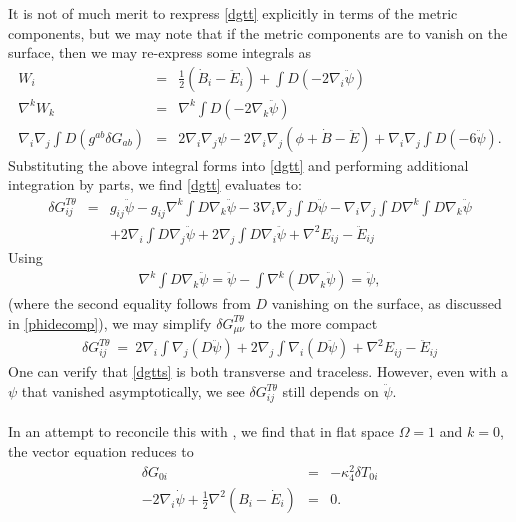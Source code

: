 \documentclass[10pt,letterpaper]{article}
\numberwithin{equation}{section}
\begin{document}
It is not of much merit to rexpress \eqref{dgtt} explicitly in terms of the metric components, but we may note that if the metric components are to vanish on the surface, then we may re-express some integrals as
\begin{eqnarray}
W_i &=& \tfrac12 (\dot B_i-\ddot E_i) + \int D (-2\nabla_i\ddot \psi)
\nonumber\\
\nabla^k W_k &=& \nabla^k \int D(-2\nabla_k \ddot\psi)
\nonumber\\
\nabla_i\nabla_j\int D(g^{ab}\delta G_{ab}) &=& 2\nabla_i\nabla_j \psi -2\nabla_i\nabla_j(\phi+\dot B-\ddot E)
+\nabla_i\nabla_j \int D (-6\ddot \psi).
\end{eqnarray}
Substituting the above integral forms into \eqref{dgtt} and performing additional integration by parts, we find \eqref{dgtt} evaluates to:
\begin{eqnarray}
\delta G_{ij}^{T\theta} &=& g_{ij}\ddot\psi - g_{ij}\nabla^k\int D \nabla_k\ddot\psi - 3\nabla_i\nabla_j \int D \ddot\psi
-\nabla_i\nabla_j \int D \nabla^k\int D\nabla_k\ddot\psi
\nonumber\\
&&+2\nabla_i\int D \nabla_j\ddot \psi + 2\nabla_j\int D\nabla_i \ddot\psi + \nabla^2 E_{ij} - \ddot E_{ij} 
\end{eqnarray}
Using
\begin{eqnarray}
\nabla^k\int D \nabla_k \ddot \psi = \ddot\psi -\int \nabla^k(D\nabla_k\ddot\psi)=\ddot\psi,
\end{eqnarray}
(where the second equality follows from $D$ vanishing on the surface, as discussed in \eqref{phidecomp}),
we may simplify $\delta G_{\mu\nu}^{T\theta}$ to the more compact
\begin{eqnarray}
\boxed{\delta G_{ij}^{T\theta} \ =\  2\nabla_i\int \nabla_j(D\ddot\psi)+2\nabla_j\int \nabla_i(D\ddot\psi)+\nabla^2 E_{ij} -\ddot E_{ij}}
\label{dgtts}
\end{eqnarray}
One can verify that \eqref{dgtts} is both transverse and traceless. However, even with a $\psi$ that vanished asymptotically, we see $\delta G^{T\theta}_{ij}$ still depends on $\ddot\psi$. 
\\ \\
In an attempt to reconcile this with \cite{Einrw}, we find that in flat space $\Omega=1$ and $k=0$, the vector equation reduces to
\begin{eqnarray}
\delta G_{0i} &=& -\kappa^2_4 \delta T_{0i}
\nonumber\\
-2\nabla_i \dot\psi +\tfrac12\nabla^2(B_i-\dot E_i) &=& 0.
\end{eqnarray}
\end{document}
